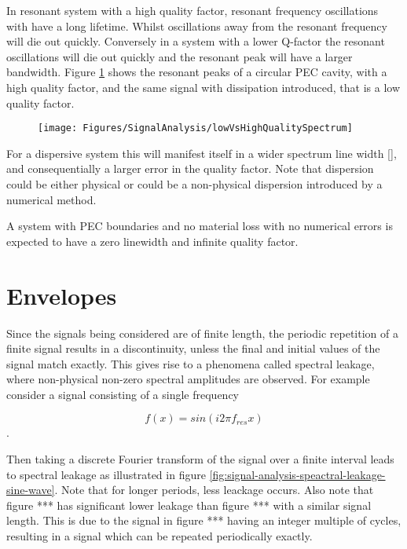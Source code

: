 In resonant system with a high quality factor, resonant frequency oscillations with have a long lifetime. Whilst oscillations away from the resonant frequency will die out quickly. Conversely in a system with a lower Q-factor the resonant oscillations will die out quickly and the resonant peak will have a larger bandwidth. Figure \ref{fig:signal-analysis-low-vs-high-q-spectrum} shows the resonant peaks of a circular PEC cavity, with a high quality factor, and the same signal with dissipation introduced, that is a low quality factor.

\begin{figure}
\begin{center}
    \texttt{[image: Figures/SignalAnalysis/lowVsHighQualitySpectrum]}
\end{center}
\caption{}
\label{fig:signal-analysis-low-vs-high-q-spectrum}
\end{figure}

For a dispersive system this will manifest itself in a wider spectrum line width [], and consequentially a larger error in the quality factor. Note that dispersion could be either physical or could be a non-physical dispersion introduced by a numerical method.

A system with PEC boundaries and no material loss with no numerical errors is expected to have a zero linewidth and infinite quality factor.



\section{Envelopes}
Since the signals being considered are of finite length, the periodic repetition of a finite signal results in a discontinuity, unless the final and initial values of the signal match exactly. This gives rise to a phenomena called spectral leakage, where non-physical non-zero spectral amplitudes are observed. For example consider a signal consisting of a single frequency

$$
f(x) = sin(i2 \pi f_{res} x)
$$
.

Then taking a discrete Fourier transform of the signal over a finite interval leads to spectral leakage as illustrated in figure \ref{fig:signal-analysis-speactral-leakage-sine-wave}. Note that for longer periods, less leackage occurs. Also note that figure {***} has significant lower leakage than figure {***} with a similar signal length. This is due to the signal in figure {***} having an integer multiple of cycles, resulting in a signal which can be repeated periodically exactly.

